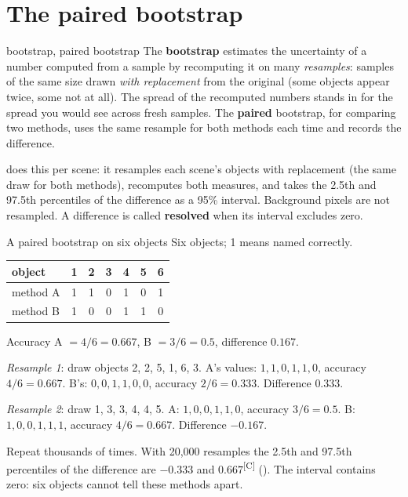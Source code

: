 \documentclass[11pt,a4paper,oneside,openany]{book}
\newcommand{\comp}{\textsuperscript{\textsf{\scriptsize[C]}}}
\begin{document}
\section{The paired bootstrap}

\begin{defn}{bootstrap, paired bootstrap}
The \textbf{bootstrap} estimates the uncertainty of a number computed from a sample by recomputing it on many \emph{resamples}: samples of the same size drawn \emph{with replacement}
from the original (some objects appear twice, some not at all). The spread of the recomputed numbers stands in for the spread you would see across fresh samples. The
\textbf{paired} bootstrap, for comparing two methods, uses the same resample for both methods each time and records the difference.
\end{defn}

 does this per scene: it resamples each scene's objects with replacement (the same draw for both methods), recomputes both measures, and
takes the 2.5th and 97.5th percentiles of the difference as a 95\% interval. Background pixels are not resampled. A difference is called \textbf{resolved} when its interval
excludes zero.

\begin{worked}[label=we:boot]{A paired bootstrap on six objects}
Six objects; 1 means named correctly.
\begin{center}
\begin{tabular}{@{}lcccccc@{}}
\toprule
object & 1 & 2 & 3 & 4 & 5 & 6\\
\midrule
method A & 1 & 1 & 0 & 1 & 0 & 1\\
method B & 1 & 0 & 0 & 1 & 1 & 0\\
\bottomrule
\end{tabular}
\end{center}
Accuracy A $=4/6=0.667$, B $=3/6=0.5$, difference $0.167$.

\emph{Resample 1}: draw objects 2, 2, 5, 1, 6, 3. A's values: $1,1,0,1,1,0$, accuracy $4/6=0.667$. B's: $0,0,1,1,0,0$, accuracy $2/6=0.333$. Difference $0.333$.

\emph{Resample 2}: draw 1, 3, 3, 4, 4, 5. A: $1,0,0,1,1,0$, accuracy $3/6=0.5$. B: $1,0,0,1,1,1$, accuracy $4/6=0.667$. Difference $-0.167$.

Repeat thousands of times. With 20{,}000 resamples the 2.5th and 97.5th percentiles of the difference are $-0.333$ and $0.667$\comp
(). The interval contains zero: six objects cannot tell these methods apart.
\end{worked}
\end{document}
